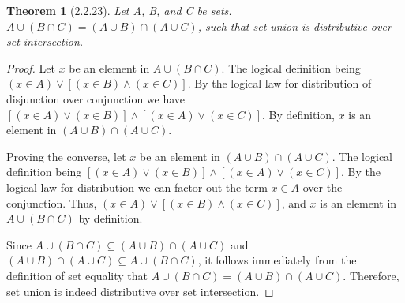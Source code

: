 \documentclass[a4paper, 12pt]{article}
\theoremstyle{plain}
\newtheorem*{theorem*}{Theorem}
\begin{document}
	
	\begin{theorem*}[2.2.23]
		Let A, B, and C be sets. $A \cup (B \cap C) = (A \cup B) \cap (A \cup C)$, such that set union is distributive over set intersection.
	\end{theorem*}
	
	\begin{proof}
		Let $x$ be an element in $A \cup (B \cap C)$. The logical definition being \newline $(x \in A) \lor [(x \in B) \land (x \in C)]$. By the logical law for distribution of disjunction over conjunction we have $[(x \in A) \lor (x \in B)] \land [(x \in A) \lor (x \in C)]$. By definition, $x$ is an element in $(A \cup B) \cap (A \cup C)$.
		
		Proving the converse, let $x$ be an element in $(A \cup B) \cap (A \cup C)$. The logical definition being $[(x \in A) \lor (x \in B)] \land [(x \in A) \lor (x \in C)]$. By the logical law for distribution we can factor out the term $x \in A$ over the conjunction. Thus, $(x \in A) \lor [(x \in B) \land (x \in C)]$, and $x$ is an element in $A \cup (B \cap C)$ by definition.
		
		Since $A \cup (B \cap C) \subseteq (A \cup B) \cap (A \cup C)$ and \newline $(A \cup B) \cap (A \cup C) \subseteq A \cup (B \cap C)$, it follows immediately from the definition of set equality that $A \cup (B \cap C) = (A \cup B) \cap (A \cup C)$. Therefore, set union is indeed distributive over set intersection.
	\end{proof}
\end{document}
